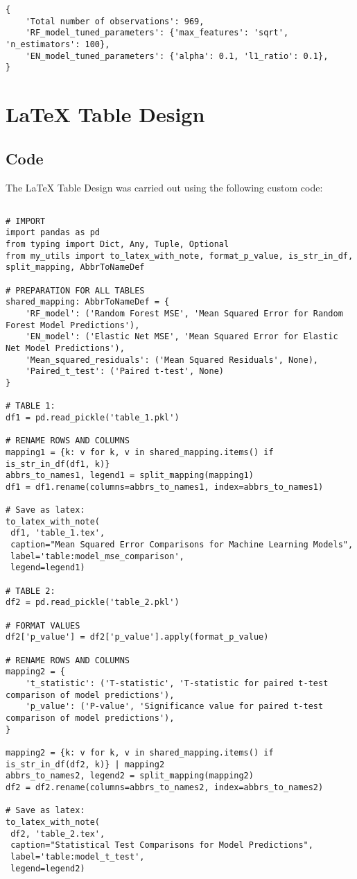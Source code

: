 \documentclass[11pt]{article}
\begin{document}
\begin{Verbatim}[tabsize=4]
{
    'Total number of observations': 969,
    'RF_model_tuned_parameters': {'max_features': 'sqrt', 'n_estimators': 100},
    'EN_model_tuned_parameters': {'alpha': 0.1, 'l1_ratio': 0.1},
}
\end{Verbatim}

\section{LaTeX Table Design}
\subsection{{Code}}
The LaTeX Table Design was carried out using the following custom code:

\begin{verbatim}

# IMPORT
import pandas as pd
from typing import Dict, Any, Tuple, Optional
from my_utils import to_latex_with_note, format_p_value, is_str_in_df, split_mapping, AbbrToNameDef

# PREPARATION FOR ALL TABLES
shared_mapping: AbbrToNameDef = {
    'RF_model': ('Random Forest MSE', 'Mean Squared Error for Random Forest Model Predictions'),
    'EN_model': ('Elastic Net MSE', 'Mean Squared Error for Elastic Net Model Predictions'),
    'Mean_squared_residuals': ('Mean Squared Residuals', None),
    'Paired_t_test': ('Paired t-test', None)
}

# TABLE 1:
df1 = pd.read_pickle('table_1.pkl')

# RENAME ROWS AND COLUMNS
mapping1 = {k: v for k, v in shared_mapping.items() if is_str_in_df(df1, k)}
abbrs_to_names1, legend1 = split_mapping(mapping1)
df1 = df1.rename(columns=abbrs_to_names1, index=abbrs_to_names1)

# Save as latex:
to_latex_with_note(
 df1, 'table_1.tex',
 caption="Mean Squared Error Comparisons for Machine Learning Models", 
 label='table:model_mse_comparison',
 legend=legend1)

# TABLE 2:
df2 = pd.read_pickle('table_2.pkl')

# FORMAT VALUES 
df2['p_value'] = df2['p_value'].apply(format_p_value)

# RENAME ROWS AND COLUMNS 
mapping2 = {
    't_statistic': ('T-statistic', 'T-statistic for paired t-test comparison of model predictions'),
    'p_value': ('P-value', 'Significance value for paired t-test comparison of model predictions'),
}

mapping2 = {k: v for k, v in shared_mapping.items() if is_str_in_df(df2, k)} | mapping2
abbrs_to_names2, legend2 = split_mapping(mapping2)
df2 = df2.rename(columns=abbrs_to_names2, index=abbrs_to_names2)

# Save as latex:
to_latex_with_note(
 df2, 'table_2.tex',
 caption="Statistical Test Comparisons for Model Predictions", 
 label='table:model_t_test',
 legend=legend2)

\end{verbatim}
\end{document}
